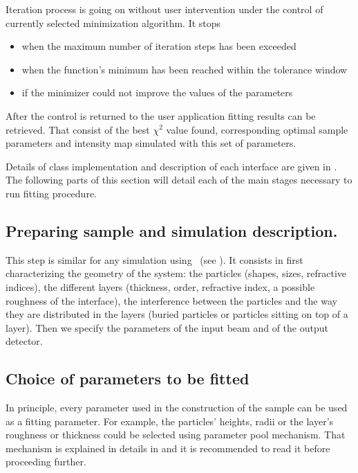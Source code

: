 Iteration process is going on without user intervention under the control of currently selected minimization algorithm. It stops 
\begin{itemize}
\item when the maximum number of iteration steps has been exceeded
\item when the function's minimum has been reached within the tolerance window 
\item if the minimizer could not improve the values of the parameters 
\end{itemize}

After the control is returned to the user application fitting results can be retrieved.
That consist of the best $\chi^2$ value found, corresponding optimal sample parameters and intensity map simulated with this set of parameters.

Details of  class implementation and description
of each interface are given in . The following parts of this section will detail each of
the main stages necessary to run fitting procedure.


%
\subsection{Preparing sample and simulation description.}

This step is similar for any simulation using \BornAgain\ (see ). It consists in first characterizing  the geometry of the system: the particles 
(shapes, sizes, refractive
indices), the different layers (thickness,
order, refractive index, a possible roughness of the interface), the
interference between the particles and the way they are distributed in
the layers (buried particles or particles sitting on top of a
layer). 
Then we specify the parameters of the input beam and of the
output detector.


%
\subsection{Choice of parameters to be fitted}
In principle, every parameter used in the construction of the sample
can be used as a fitting parameter. For example, the particles'
heights, radii or the layer's roughness or thickness could be selected using
parameter pool mechanism. 
That mechanism is explained in details in  and it is recommended to read it before proceeding further.

